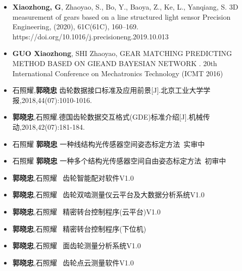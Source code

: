 %
%



\vspace{1ex}
\begin{itemize}
	\item \textbf{Xiaozhong, G}, Zhaoyao, S., Bo, Y., Baoya, Z., Ke, L., Yanqiang, S. 3D measurement of gears based on a line structured light sensor Precision Engineering, (2020), 61C(61C), 160–169. https://doi.org/10.1016/j.precisioneng.2019.10.013\\
	 { \footnotesize {}} 
	 \item \textbf{GUO Xiaozhong}, SHI Zhaoyao, GEAR MATCHING PREDICTING METHOD BASED ON GIEAND BAYESIAN NETWORK .	20th International Conference on Mechatronics Technology (ICMT 2016)\\
	 { \footnotesize {}}
	 \item 石照耀,\textbf{郭晓忠} 齿轮数据接口标准及应用前景[J].北京工业大学学报,2018,44(07):1010-1016.	\\
	 { \footnotesize {}}
	\item \textbf{郭晓忠},石照耀.德国齿轮数据交互格式(GDE)标准介绍[J].机械传动,2018,42(07):181-184.\\
	 { \footnotesize {}}
	\item 石照耀 \textbf{郭晓忠}  一种线结构光传感器空间姿态标定方法\ 实审中\\
	 { \footnotesize {}}
	 \item 石照耀 \textbf{郭晓忠}  一种多个结构光传感器空间自由姿态标定方法\ 初审中\\
	 { \footnotesize {}}
	 \item \textbf{郭晓忠},石照耀 \ 齿轮智能配对软件V1.0 \\
	 { \footnotesize {}}
	 \item \textbf{郭晓忠},石照耀 \ 齿轮双啮测量仪云平台及大数据分析系统V1.0 \\
	 { \footnotesize {}}
	\item \textbf{郭晓忠},石照耀 \ 精密转台控制程序(云平台)V1.0 \\
	 { \footnotesize {}}
	\item \textbf{郭晓忠},石照耀 \ 精密转台控制程序(下位机) \\
	 { \footnotesize {}}
	\item \textbf{郭晓忠},石照耀  \ 面齿轮测量分析系统V1.0 \\
	 { \footnotesize {}}
	\item \textbf{郭晓忠},石照耀 \  齿轮点云测量软件V1.0 \\
	 { \footnotesize {}}
\end{itemize}